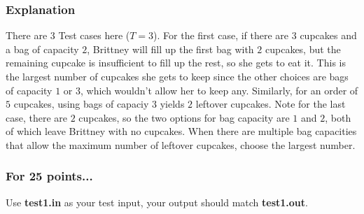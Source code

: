 \documentclass[titlepage]{article}
\begin{document}
\subsubsection*{Explanation} 
There are $3$ Test cases here ($T = 3$). For the first case, if there are $3$ cupcakes and a bag of capacity $2$, Brittney will fill up the first bag with $2$ cupcakes, but the remaining cupcake is insufficient to fill up the rest, so she gets to eat it. This is the largest number of cupcakes she gets to keep since the other choices are bags of capacity $1$ or $3$, which wouldn't allow her to keep any. Similarly, for an order of $5$ cupcakes, using bags of capaciy $3$ yields $2$ leftover cupcakes. Note for the last case, there are $2$ cupcakes, so the two options for bag capacity are $1$ and $2$, both of which leave Brittney with no cupcakes. 
\newline \newline
When there are multiple bag capacities that allow the maximum number of leftover cupcakes, choose the largest number. 

\subsubsection*{For 25 points...}
Use \textbf{test1.in} as your test input, your output should match \textbf{test1.out}.
\newpage
\end{document}
